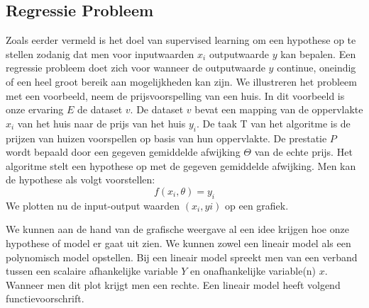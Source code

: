 \subsection{Regressie Probleem}\label{Regressie Probleem}

Zoals eerder vermeld is het doel van supervised learning om een hypothese op te stellen zodanig dat men voor inputwaarden $x_{i}$ outputwaarde $y$ kan bepalen. Een regressie probleem doet zich voor wanneer de outputwaarde $y$ continue, oneindig of een heel groot bereik aan mogelijkheden kan zijn. We illustreren het probleem met een voorbeeld, neem de prijsvoorspelling van een huis. 
In dit voorbeeld is onze ervaring $E$ de dataset $v$. De dataset $v$ bevat een mapping van de oppervlakte $x_{i}$ van het huis naar de prijs van het huis $y_{i}$. De taak T van het algoritme is de prijzen van huizen voorspellen op basis van hun oppervlakte. De prestatie $P$ wordt bepaald door een gegeven gemiddelde afwijking $\Theta$ van de echte prijs. Het algoritme stelt een hypothese op met de gegeven gemiddelde afwijking. Men kan de hypothese als volgt voorstellen:
\[ f(x_{i},\theta) = y_{i} \] 
\newline
We plotten nu de input-output waarden $(x_{i},y{i})$ op een grafiek.
\newline
\begin{center}
\end{center}
\newline
%
 We kunnen aan de hand van de grafische weergave al een idee krijgen hoe onze hypothese of model er gaat uit zien. We kunnen zowel een lineair model als een polynomisch model opstellen. Bij een lineair model spreekt men van een verband tussen een scalaire afhankelijke variable $Y$ en onafhankelijke variable(n) $x$. Wanneer men dit plot krijgt men een rechte. Een lineair model heeft volgend functievoorschrift.
